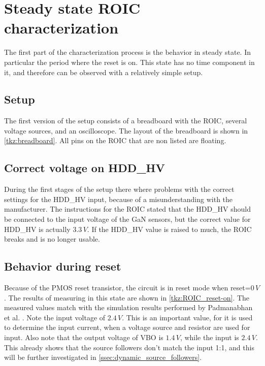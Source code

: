 \section{Steady state ROIC characterization}\label{sec:steady_state_ROIC_characerization}
The first part of the characterization process is the behavior in steady state. In particular the period where the reset is on. This state has no time component in it, and therefore can be observed with a relatively simple setup.

\subsection{Setup}\label{ssec:steady_state_setup}
The first version of the setup consists of a breadboard with the ROIC, several voltage sources, and an oscilloscope. The layout of the breadboard is shown in \cref{tkz:breadboard}. All pins on the ROIC that are non listed are floating.




\subsection{Correct voltage on HDD\_HV}
During the first stages of the setup there where problems with the correct settings for the HDD\_HV input, because of a misunderstanding with the manufacturer. The instructions for the ROIC stated that the HDD\_HV should be connected to the input voltage of the GaN sensors, but the correct value for HDD\_HV is actually $3.3\,V$. If the HDD\_HV value is raised to much, the ROIC breaks and is no longer usable.


\subsection{Behavior during reset}

Because of the PMOS reset transistor, the circuit is in reset mode when reset=$0\,V$. The results of measuring in this state are shown in \cref{tkz:ROIC_reset-on}. The measured values match with the simulation results performed by Padmanabhan et al. \cite{preethi}. Note the input voltage of $2.4\,V$. This is an important value, for it is used to determine the input current, when a voltage source and resistor are used for input. Also note that the output voltage of VBO is $1.4\,V$, while the input is $2.4\,V$. This already shows that the source followers don't match the input 1:1, and this will be further investigated in \cref{ssec:dynamic_source_followers}. 

